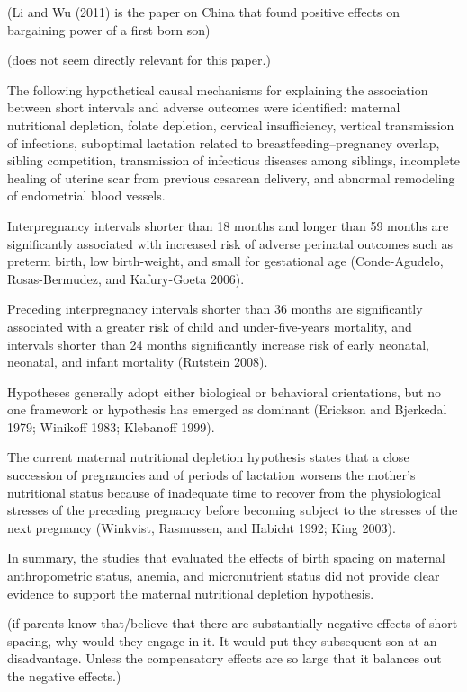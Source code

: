 (Li and Wu (2011) is the paper on China that found positive effects on
bargaining power of a first born son)

(does not seem directly relevant for this paper.)

\citet{Conde-Agudelo2012}

The following hypothetical causal mechanisms for explaining the
association between short intervals and adverse outcomes were
identified: maternal nutritional depletion, folate depletion, cervical
insufficiency, vertical transmission of infections, suboptimal lactation
related to breastfeeding–pregnancy overlap, sibling competition,
transmission of infectious diseases among siblings, incomplete healing
of uterine scar from previous cesarean delivery, and abnormal remodeling
of endometrial blood vessels.

Interpregnancy intervals shorter than 18 months and longer than 59
months are significantly associated with increased risk of adverse
perinatal outcomes such as preterm birth, low birth-weight, and small
for gestational age (Conde-Agudelo, Rosas-Bermudez, and Kafury-Goeta
2006).

Preceding interpregnancy intervals shorter than 36 months are
significantly associated with a greater risk of child and
under-five-years mortality, and intervals shorter than 24 months
significantly increase risk of early neonatal, neonatal, and infant
mortality (Rutstein 2008).

Hypotheses generally adopt either biological or behavioral orientations,
but no one framework or hypothesis has emerged as dominant (Erickson and
Bjerkedal 1979; Winikoff 1983; Klebanoff 1999).

The current maternal nutritional depletion hypothesis states that a
close succession of pregnancies and of periods of lactation worsens the
mother’s nutritional status because of inadequate time to recover from
the physiological stresses of the preceding pregnancy before becoming
subject to the stresses of the next pregnancy (Winkvist, Rasmussen, and
Habicht 1992; King 2003).

In summary, the studies that evaluated the effects of birth spacing on
maternal anthropometric status, anemia, and micronutrient status did not
provide clear evidence to support the maternal nutritional depletion
hypothesis.

(if parents know that/believe that there are substantially negative 
effects of short spacing, why would they engage in it. It would put
they subsequent son at an disadvantage. Unless the compensatory effects
are so large that it balances out the negative effects.)

